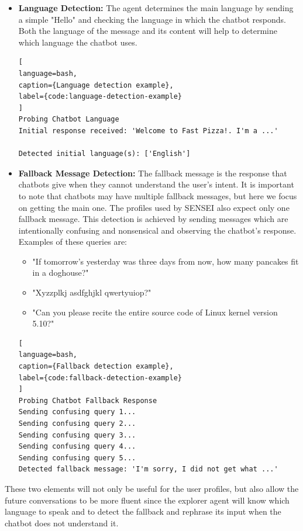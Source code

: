 \begin{itemize}
  \item \textbf{Language Detection:}
    The agent determines the main language by sending
    a simple "Hello" and checking the language in which the chatbot responds.
    Both the language of the message and its content will help to determine which language the chatbot uses.

\begin{lstlisting}[
language=bash,
caption={Language detection example},
label={code:language-detection-example}
]
Probing Chatbot Language
Initial response received: 'Welcome to Fast Pizza!. I'm a ...'

Detected initial language(s): ['English']
\end{lstlisting}

  \item \textbf{Fallback Message Detection:}
    The fallback message is the response that chatbots give
    when they cannot understand the user's intent.
    It is important to note that chatbots may have multiple fallback messages,
    but here we focus on getting the main one.
    The profiles used by SENSEI also expect only one fallback message.
    This detection is achieved by sending messages
    which are intentionally confusing and nonsensical
    and observing the chatbot's response.
    Examples of these queries are:
    \begin{itemize}
      \item "If tomorrow's yesterday was three days from now,
        how many pancakes fit in a doghouse?"
      \item "Xyzzplkj asdfghjkl qwertyuiop?"
      \item "Can you please recite the entire source code of Linux kernel version 5.10?"
    \end{itemize}

\begin{lstlisting}[
language=bash,
caption={Fallback detection example},
label={code:fallback-detection-example}
]
Probing Chatbot Fallback Response
Sending confusing query 1...
Sending confusing query 2...
Sending confusing query 3...
Sending confusing query 4...
Sending confusing query 5...
Detected fallback message: 'I'm sorry, I did not get what ...'
\end{lstlisting}

\end{itemize}

These two elements will not only be useful for the user profiles,
but also allow the future conversations to be more fluent
since the explorer agent will know which language to speak
and to detect the fallback and rephrase its input
when the chatbot does not understand it.


